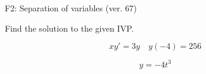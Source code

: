 \begin{exercise}
  \begin{exerciseTitle}F2: Separation of variables (ver. 67)\end{exerciseTitle}
  \begin{exerciseStatement}
    
Find the solution to the given IVP.

    
\[xy'= 3 y \hspace{1em} y( -4 ) = 256\]

  \end{exerciseStatement}
  \begin{exerciseAnswer}
    
\[y= -4 t^ 3\]

  \end{exerciseAnswer}
\end{exercise}